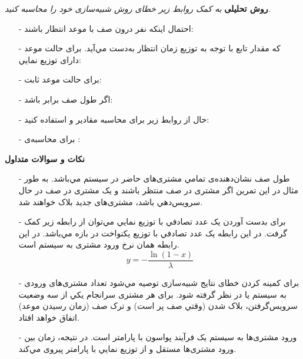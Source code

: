\documentclass[12pt]{article}
\begin{document}
    \newpage
    \textbf{روش تحلیلی}
    \newline
    \textit{به‌ کمک روابط زیر خطای روش شبیه‌سازی خود را محاسبه کنید.}
    \begin{itemize}
	\item[-]
	احتمال اینکه  نفر درون صف  با موعد انتظار باشند:
    \lr{\[
	P_n =
	\begin{cases}
	    P_0(\frac{\lambda}{\mu}),
		&\quad\text{n = 1} \\
		P_0\lambda^n\frac{\varphi_{n-1}(\mu)}{(n-1)!},
		&\quad\text{n > 1}
	\end{cases}
	\]}
    
    \item[-]
	که مقدار تابع  با توجه به توزیع زمان انتظار به‌دست مي‌آید. برای حالت موعد دارای توزیع نمایي:
    \lr{\[
	\varphi_n(\mu) = \frac{n!}{\prod_{i=0}^{n} (\mu + i/\bar\theta)}
	\]}
    \item[-]
	برای حالت موعد ثابت:
    \lr{\[
	\varphi_n(\mu) = \frac{n!}{\mu^{n+1}}(1 - e^{-\mu\bar\theta}\sum_{i=0}^{n-1} \frac{(\mu\bar\theta)^i}{i!})
	\]}
    \item[-]
	اگر طول صف برابر  باشد:
    \lr{\[
    \sum_{i=0}^{K} P_i = 1
	\]}
    \item[-]
	حال از روابط زیر برای محاسبه مقادیر  و  استفاده کنید:
    \lr{\[
    P_b = P_K
    \]
    \[
    P_d + P_b = 1 - \frac{\mu}{\lambda}(\sum_{i=1}^{K} P_i) = 1 - \frac{\mu}{\lambda}(1 - P_0)
	\]}
    \item[-]
	برای محاسبه‌ی  :
    \lr{\[
    N_c = \sum_{i=1}^{K} (i.P_i)
    \]}
	\end{itemize}
	
	\newpage
    \textbf{نکات و سوالات متداول}
    \begin{itemize}
	\item[-]
	طول صف نشان‌دهنده‌ی تمامي مشتری‌های حاضر در سیستم مي‌باشد. به طور مثال در این تمرین اگر  مشتری در صف
منتظر باشند و یک مشتری در صف در حال سرویس‌دهي باشد، مشتری‌های جدید بلاک خواهند شد. 
	\item[-]
برای بدست آوردن یک عدد تصادفي با توزیع نمایي مي‌توان از رابطه زیر کمک گرفت. در این رابطه  یک عدد تصادفي با
توزیع یکنواخت  در بازه \lr{$[0,1)$} مي‌باشد. در این رابطه \lr{$\lambda$} همان نرخ ورود مشتری به سیستم است. 
    \[
    y = - \frac{\ln(1 - x)}{\lambda}
    \]
    \item[-]
برای کمینه کردن خطای نتایج شبیه‌سازی توصیه مي‌شود تعداد مشتری‌های ورودی به سیستم  یا  در نظر گرفته
شود. برای هر مشتری سرانجام یکي از سه وضعیت سرویس‌گرفتن، بلاک شدن (وقتي صف پر است) و ترک صف (زمان  رسیدن موعد) اتفاق خواهد افتاد.
	\item[-]
ورود مشتری‌ها به سیستم یک فرآیند پواسون با پارامتر \lr{$\lambda$} است. در نتیجه، زمان بین ورود مشتری‌ها مستقل و از توزیع
نمایي با پارامتر \lr{$\lambda$} پیروی مي‌کند. 
	\end{itemize}
	
\end{document}
